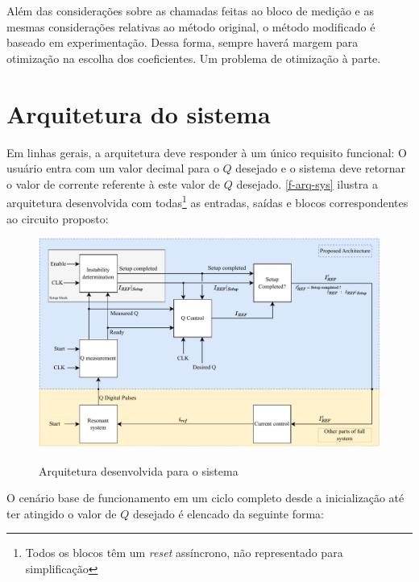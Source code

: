 Além das considerações sobre as chamadas feitas ao bloco de medição e as mesmas considerações relativas ao método original, o método modificado é baseado em experimentação. Dessa forma, sempre haverá margem para otimização na escolha dos coeficientes. Um problema de otimização à parte.



\section{Arquitetura do sistema}\label{sec-arquitetura}

 Em linhas gerais, a arquitetura deve responder à um único requisito funcional: O usuário entra com um valor decimal para o $Q$ desejado e o sistema deve retornar o valor de corrente referente à este valor de $Q$ desejado. \autoref{f-arq-sys} ilustra a arquitetura desenvolvida com todas\footnote{Todos os blocos têm um \textit{reset} assíncrono, não representado para simplificação} as entradas, saídas e blocos correspondentes ao circuito proposto:

\begin{figure}[H]
    \centering
    \caption{Arquitetura desenvolvida para o sistema}
    \includegraphics{fig/tcc-nova-arq.pdf}
    \label{f-arq-sys}
\end{figure}

O cenário base de funcionamento em um ciclo completo desde a inicialização até ter atingido o valor de $Q$ desejado é elencado da seguinte forma:

